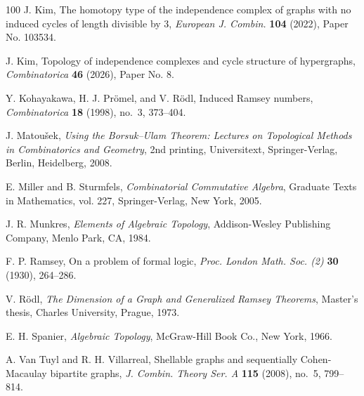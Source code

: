\documentclass{article}
\theoremstyle{plain}
\theoremstyle{definition}
\begin{document}
\begin{thebibliography}{100}
J. Kim, The homotopy type of the independence complex of graphs with no induced cycles of length divisible by 3, \emph{European J. Combin.} \textbf{104} (2022), Paper No. 103534.

J. Kim, Topology of independence complexes and cycle structure of hypergraphs, \emph{Combinatorica} \textbf{46} (2026), Paper No. 8.

Y. Kohayakawa, H. J. Pr\"omel, and V. R\"odl, Induced Ramsey numbers, \emph{Combinatorica} \textbf{18} (1998), no.~3, 373--404.

J. Matou\v{s}ek, \emph{Using the Borsuk--Ulam Theorem: Lectures on Topological Methods in Combinatorics and Geometry}, 2nd printing, Universitext, Springer-Verlag, Berlin, Heidelberg, 2008.

E. Miller and B. Sturmfels, \emph{Combinatorial Commutative Algebra}, Graduate Texts in Mathematics, vol. 227, Springer-Verlag, New York, 2005.

J. R. Munkres, \emph{Elements of Algebraic Topology}, Addison-Wesley Publishing Company, Menlo Park, CA, 1984.

F. P. Ramsey, On a problem of formal logic, \emph{Proc. London Math. Soc. (2)} \textbf{30} (1930), 264--286.

V. R\"odl, \emph{The Dimension of a Graph and Generalized Ramsey Theorems}, Master's thesis, Charles University, Prague, 1973.

E. H. Spanier, \emph{Algebraic Topology}, McGraw-Hill Book Co., New York, 1966.

A. Van Tuyl and R. H. Villarreal, Shellable graphs and sequentially Cohen-Macaulay bipartite graphs, \emph{J. Combin. Theory Ser. A} \textbf{115} (2008), no.~5, 799--814.


\end{thebibliography}
\end{document}
